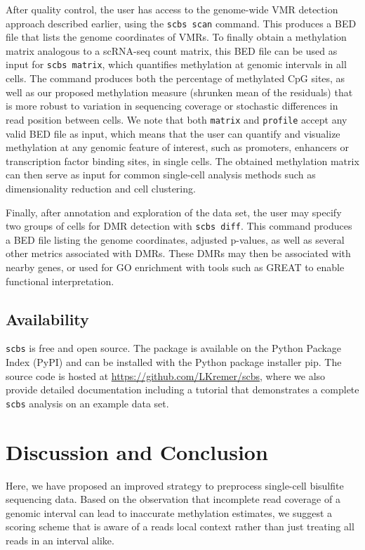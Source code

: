 \documentclass[twocolumn,10pt]{article}
\begin{document}
After quality control, the user has access to the genome-wide VMR detection approach described earlier, using the \texttt{scbs scan} command.
This produces a BED file that lists the genome coordinates of VMRs.
To finally obtain a methylation matrix analogous to a scRNA-seq count matrix, this BED file can be used as input for \texttt{scbs matrix}, which quantifies methylation at genomic intervals in all cells.
The command produces both the percentage of methylated CpG sites, as well as our proposed methylation measure (shrunken mean of the residuals) that is more robust to variation in sequencing coverage or stochastic differences in read position between cells.
We note that both \texttt{matrix} and \texttt{profile} accept any valid BED file as input, which means that the user can quantify and visualize methylation at any genomic feature of interest, such as promoters, enhancers or transcription factor binding sites, in single cells.
The obtained methylation matrix can then serve as input for common single-cell analysis methods such as dimensionality reduction and cell clustering.

Finally, after annotation and exploration of the data set, the user may specify two groups of cells for DMR detection with \texttt{scbs diff}.
This command produces a BED file listing the genome coordinates, adjusted p-values, as well as several other metrics associated with DMRs.
These DMRs may then be associated with nearby genes, or used for GO enrichment with tools such as GREAT \citep{mclean2010great} to enable functional interpretation.


\subsection{Availability}

\texttt{scbs} is free and open source.
The package is available on the Python Package Index (PyPI) and can be installed with the Python package installer pip.
The source code is hosted at \href{https://github.com/LKremer/scbs}{https://github.com/LKremer/scbs}, where we also provide detailed documentation including a tutorial that demonstrates a complete \texttt{scbs} analysis on an example data set.


\section{Discussion and Conclusion}

Here, we have proposed an improved strategy to preprocess single-cell bisulfite sequencing data.
Based on the observation that incomplete read coverage of a genomic interval can lead to inaccurate methylation estimates, we suggest a scoring scheme that is aware of a reads local context rather than just treating all reads in an interval alike.
\end{document}
